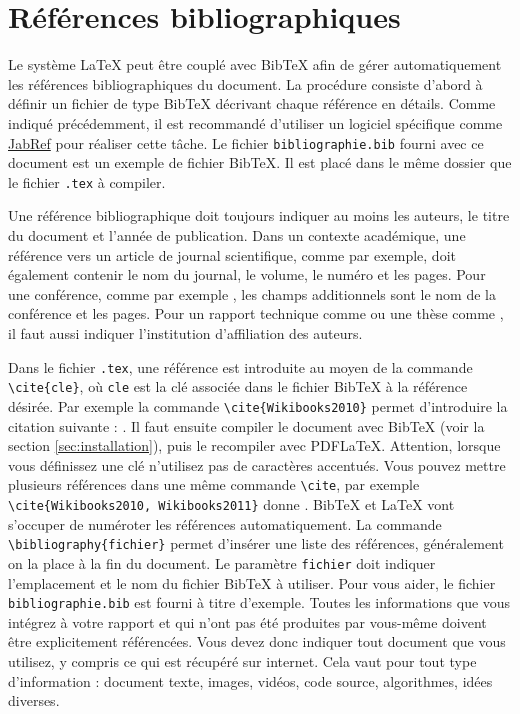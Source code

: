 \documentclass{ceri}
\begin{document}
\section{Références bibliographiques}
\label{sec:biblio}
Le système \LaTeX{} peut être couplé avec BibTeX afin de gérer automatiquement les références bibliographiques du document. La procédure consiste d'abord à définir un fichier de type BibTeX décrivant chaque référence en détails. Comme indiqué précédemment, il est recommandé d'utiliser un logiciel spécifique comme \href{http://jabref.sourceforge.net/}{JabRef} \cite{JabRef2008} pour réaliser cette tâche. Le fichier \texttt{bibliographie.bib} fourni avec ce document est un exemple de fichier BibTeX. Il est placé dans le même dossier que le fichier \texttt{.tex} à compiler.

Une référence bibliographique doit toujours indiquer au moins les auteurs, le titre du document et l'année de publication. Dans un contexte académique, une référence vers un article de journal scientifique, comme \cite{Fortunato2010} par exemple, doit également contenir le nom du journal, le volume, le numéro et les pages. Pour une conférence, comme par exemple \cite{Wei1989}, les champs additionnels sont le nom de la conférence et les pages. Pour un rapport technique comme \cite{Rosvall2009a} ou une thèse comme \cite{Gerbaud2010}, il faut aussi indiquer l'institution d'affiliation des auteurs.

Dans le fichier \texttt{.tex}, une référence est introduite au moyen de la commande \texttt{\textbackslash{}cite\{cle\}}, où \texttt{cle} est la clé associée dans le fichier BibTeX à la référence désirée. Par exemple la commande \texttt{\textbackslash{}cite\{Wikibooks2010\}} permet d'introduire la citation suivante : \cite{Wikibooks2010}. Il faut ensuite compiler le document avec BibTeX (voir la section \ref{sec:installation}), puis le recompiler avec PDFLaTeX.
Attention, lorsque vous définissez une clé n'utilisez pas de caractères accentués. Vous pouvez mettre plusieurs références dans une même commande \texttt{\textbackslash{}cite}, par exemple \texttt{\textbackslash{}cite\{Wikibooks2010, Wikibooks2011\}} donne \cite{Wikibooks2010, Wikibooks2011}.
BibTeX et \LaTeX{} vont s'occuper de numéroter les références automatiquement. La commande \texttt{\textbackslash{}bibliography\{fichier\}} permet d'insérer une liste des références, généralement on la place à la fin du document. Le paramètre \texttt{fichier} doit indiquer l'emplacement et le nom du fichier BibTeX à utiliser. Pour vous aider, le fichier \texttt{bibliographie.bib} est fourni à titre d'exemple.
Toutes les informations que vous intégrez à votre rapport et qui n'ont pas été produites par vous-même doivent être explicitement référencées. Vous devez donc indiquer tout document que vous utilisez, y compris ce qui est récupéré sur internet. Cela vaut pour tout type d'information : document texte, images, vidéos, code source, algorithmes, idées diverses.
\end{document}

